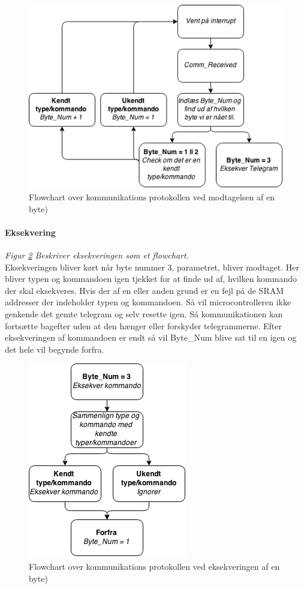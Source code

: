 \begin{figure}[p]

	\centering
		\includegraphics[scale=0.8]{Billeder/Comm_Modtagelse.png}
	\caption{Flowchart over kommunikations protokollen ved modtagelsen af en byte)}
	\label{fig:Comm_Modtagelse}
	
\end{figure}

\paragraph{Eksekvering} 
\textit{Figur \ref{fig:Comm_Eksekvering} Beskriver eksekveringen som et flowchart.} \\
Eksekveringen bliver kørt når byte nummer 3, parametret, bliver modtaget. Her bliver typen og kommandoen igen tjekket for at finde ud af, hvilken kommando der skal eksekveres. Hvis der af en eller anden grund er en fejl på de SRAM addresser der indeholder typen og kommandoen. Så vil microcontrolleren ikke genkende det gemte telegram og selv resette igen. Så kommunikationen kan fortsætte bagefter uden at den hænger eller forskyder telegrammerne. Efter eksekveringen af kommandoen er endt så vil Byte\_Num blive sat til en igen og det hele vil begynde forfra.

\begin{figure}[p]

	\centering
		\includegraphics[scale=0.8]{Billeder/Comm_Eksekvering.png}
	\caption{Flowchart over kommunikations protokollen ved eksekveringen af en byte)}
	\label{fig:Comm_Eksekvering}
	
\end{figure}


